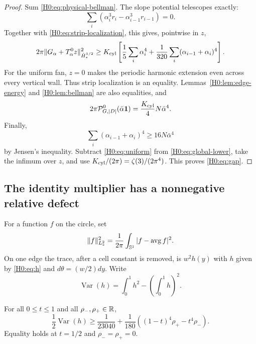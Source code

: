 \begin{proof}
Sum \eqref{H0:eq:physical-bellman}.  The slope potential telescopes exactly:
\begin{equation}
 \sum_i(\alpha_i^3r_i-\alpha_{i-1}^3r_{i-1})=0.
\end{equation}
Together with \eqref{H0:eq:strip-localization}, this gives, pointwise in $z$,
\begin{equation}\label{H0:eq:global-lower}
 2\pi\|G_\alpha+T_\alpha^0z\|_{\dot H_*^{1/2}}^2
 \ge K_{\rm cyl}\left[
 \frac15\sum_i\alpha_i^4
 +\frac1{320}\sum_i(\alpha_{i-1}+\alpha_i)^4\right].
\end{equation}
For the uniform fan, $z=0$ makes the periodic harmonic extension even
across every vertical wall.  Thus strip localization is an equality.
Lemmas~\ref{H0:lem:edge-energy} and \ref{H0:lem:bellman} are also equalities, and
\begin{equation}\label{H0:eq:uniform}
 2\pi\mathcal P_{G,|D|}^0(\bar\alpha\mathbf1)
 =\frac{K_{\rm cyl}}4N\bar\alpha^4.
\end{equation}
Finally,
\begin{equation}
 \sum_i(\alpha_{i-1}+\alpha_i)^4
 \ge16N\bar\alpha^4
\end{equation}
by Jensen's inequality.  Subtract \eqref{H0:eq:uniform} from
\eqref{H0:eq:global-lower}, take the infimum over $z$, and use
$K_{\rm cyl}/(2\pi)=\zeta(3)/(2\pi^4)$.  This proves
\eqref{H0:eq:gap}.
\end{proof}

\subsection{The identity multiplier has a nonnegative relative defect}

For a function $f$ on the circle, set
\begin{equation}
 \|f\|_{L_*^2}^2
 =\frac1{2\pi}\int_{\mathbb S^1}|f-\mathop{\rm avg}f|^2.
\end{equation}
On one edge the trace, after a cell constant is removed, is $w^2h(y)$ with
$h$ given by \eqref{H0:eq:h} and $d\theta=(w/2)dy$.  Write
\begin{equation}
 \operatorname {Var}(h)=\int_0^1h^2-\left(\int_0^1h\right)^2.
\end{equation}

\begin{lemma}\label{H0:lem:variance}
For all $0\le t\le1$ and all $\rho_-,\rho_+\in\mathbb R$,
\begin{equation}\label{H0:eq:variance}
 \frac12\operatorname {Var}(h)
 \ge\frac1{23040}
 +\frac1{180}\left((1-t)^4\rho_+-t^4\rho_-\right).
\end{equation}
Equality holds at $t=1/2$ and $\rho_-=\rho_+=0$.
\end{lemma}

